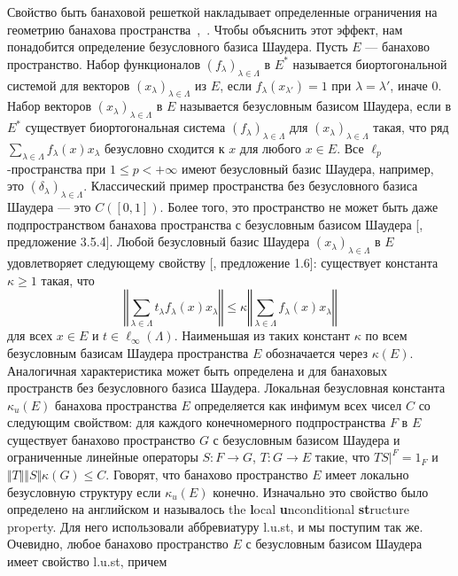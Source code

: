 Свойство быть банаховой решеткой накладывает определенные ограничения на
геометрию банахова
пространства~\cite{SherOrderInOpAlg},~\cite{KadOrderPropOfBoundSAOps}. Чтобы
объяснить этот эффект, нам понадобится определение безусловного базиса Шаудера.
Пусть $E$ --- банахово пространство. Набор функционалов
${(f_\lambda)}_{\lambda\in\Lambda}$ в $E^*$ называется биортогональной системой
для векторов ${(x_\lambda)}_{\lambda\in\Lambda}$ из $E$, если
$f_\lambda(x_{\lambda'})=1$ при $\lambda=\lambda'$, иначе $0$. Набор векторов
${(x_\lambda)}_{\lambda\in\Lambda}$ в $E$ называется безусловным базисом Шаудера,
если в $E^*$ существует биортогональная система
${(f_\lambda)}_{\lambda\in\Lambda}$ для ${(x_\lambda)}_{\lambda\in\Lambda}$ такая,
что ряд $\sum_{\lambda\in\Lambda} f_\lambda(x)x_\lambda$ безусловно сходится к
$x$ для любого $x\in E$. Все $\ell_p$-пространства при $1\leq p<+\infty$ имеют
безусловный базис Шаудера, например, это ${(\delta_\lambda)}_{\lambda\in\Lambda}$.
Классический пример пространства без безусловного базиса Шаудера --- это
$C([0,1])$. Более того, это пространство не может быть даже подпространством
банахова пространства с безусловным базисом Шаудера [\cite{KalAlbTopicsBanSpTh},
предложение 3.5.4]. Любой безусловный базис Шаудера
${(x_\lambda)}_{\lambda\in\Lambda}$ в $E$ удовлетворяет следующему свойству
[\cite{DiestAbsSumOps}, предложение 1.6]: существует константа $\kappa\geq 1$
такая, что
$$
\left\Vert \sum_{\lambda\in\Lambda}t_\lambda f_\lambda(x)x_\lambda\right\Vert
\leq
\kappa\left\Vert \sum_{\lambda\in\Lambda}f_\lambda(x)x_\lambda\right\Vert
$$
для всех $x\in E$ и $t\in\ell_\infty(\Lambda)$. Наименьшая из таких констант
$\kappa$ по всем безусловным базисам Шаудера пространства $E$ обозначается через
$\kappa(E)$. Аналогичная характеристика может быть определена и для банаховых
пространств без безусловного базиса Шаудера. Локальная безусловная константа
$\kappa_u(E)$ банахова пространства $E$ определяется как инфимум всех чисел $C$
со следующим свойством: для каждого конечномерного подпространства $F$ в $E$
существует банахово пространство $G$ с безусловным базисом Шаудера и
ограниченные линейные операторы $S:F\to G$, $T:G\to E$ такие, что $TS|^{F}=1_F$
и $\Vert T\Vert\Vert S\Vert\kappa(G)\leq C$. Говорят, что банахово пространство
$E$ имеет локально безусловную структуру если $\kappa_u(E)$ конечно. Изначально
это свойство было определено на английском и называлось the \textbf{l}ocal
\textbf{u}nconditional \textbf{st}ructure property. Для него использовали
аббревиатуру l.u.st, и мы поступим так же. Очевидно, любое банахово пространство
$E$ с безусловным базисом Шаудера имеет свойство l.u.st, причем
